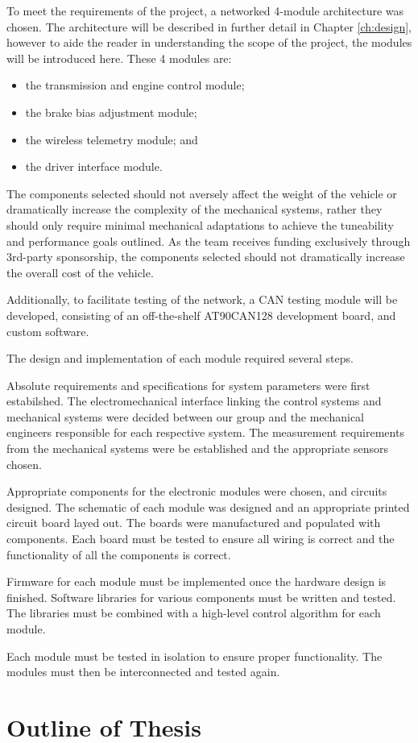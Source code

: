 To meet the requirements of the project, a networked 4-module architecture was chosen. The architecture will be described in further detail in Chapter \ref{ch:design}, however to aide the reader in understanding the scope of the project, the modules will be introduced here. These 4 modules are:

\begin{itemize}
\item the transmission and engine control module;
\item the brake bias adjustment module;
\item the wireless telemetry module; and
\item the driver interface module.
\end{itemize}

The components selected should not aversely affect the weight of the vehicle or dramatically increase the complexity of the mechanical systems, rather they should only require minimal mechanical adaptations to achieve the tuneability and performance goals outlined. As the team receives funding exclusively through 3rd-party sponsorship, the components selected should not dramatically increase the overall cost of the vehicle.

Additionally, to facilitate testing of the network, a CAN testing module will be developed, consisting of an off-the-shelf AT90CAN128 development board, and custom software.

The design and implementation of each module required several steps. 

Absolute requirements and specifications for system parameters were first estabilshed. The electromechanical interface linking the control systems and mechanical systems were decided between our group and the mechanical engineers responsible for each respective system. The measurement requirements from the mechanical systems were be established and the appropriate sensors chosen.

Appropriate components for the electronic modules were chosen, and circuits designed. The schematic of each module was designed and an appropriate printed circuit board layed out. The boards were manufactured and populated with components. Each board must be tested to ensure all wiring is correct and the functionality of all the components is correct.

Firmware for each module must be implemented once the hardware design is finished. Software libraries for various components must be written and tested. The libraries must be combined with a high-level control algorithm for each module.
 
Each module must be tested in isolation to ensure proper functionality. The modules must then be interconnected and tested again.

\section{Outline of Thesis}